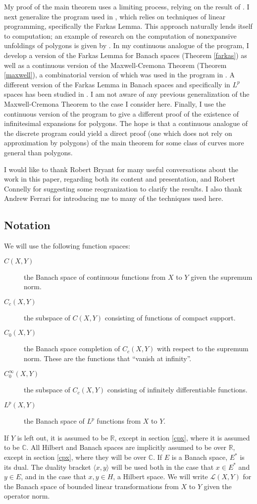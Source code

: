 \documentclass{amsart}
\newcommand{\C}			{\mathbb C}
\newcommand{\R}			{\mathbb R}
\newcommand{\Lin}		{\mathcal L}
\newcommand{\Lp}		{L^p}
\numberwithin{equation}{section}
\begin{document}
My proof of the main theorem uses a limiting process, 
relying on the result of \cite{cdr}.  I next generalize 
the program used in \cite{cdr}, which 
relies on techniques of linear programming, specifically the Farkas 
Lemma.  This approach naturally lends itself to computation; 
an example of research on the computation of nonexpansive unfoldings 
of polygons is given by \cite{energy}.  In my continuous 
analogue of the program, I develop a version of the Farkas 
Lemma for Banach spaces (Theorem \ref{farkas}) as well as a 
continuous version of the Maxwell-Cremona Theorem (Theorem 
\ref{maxwell}), a combinatorial version of which was used in 
the program in \cite{cdr}.  A different version of the Farkas Lemma 
in Banach spaces and specifically in $\Lp$ spaces has been studied 
in \cite{farkas}.  I am not aware of any previous 
generalization of the Maxwell-Cremona Theorem to the 
case I consider here.  Finally, I use the continuous 
version of the program to give a different proof of the existence 
of infinitesimal expansions for polygons.  The hope is that 
a continuous analogue of the discrete program could yield 
a direct proof (one which does not rely on approximation by 
polygons) of the main theorem for some class of curves more 
general than polygons.

I would like to thank Robert Bryant for many useful 
conversations about the work in this paper, regarding both 
its content and presentation, and Robert Connelly for 
suggesting some reogranization to clarify the results.  
I also thank Andrew Ferrari for introducing me to many of 
the techniques used here.

\subsection{Notation}

We will use the following function spaces:
\begin{description}
\item[$C(X,Y)$] the Banach space of continuous functions from 
$X$ to $Y$ given the supremum norm.
\item[$C_c(X,Y)$] the subspace of $C(X,Y)$ consisting of 
functions of compact support.
\item[$C_0(X,Y)$] the Banach space completion of $C_c(X,Y)$ 
with respect to the supremum norm.  These are the functions 
that ``vanish at infinity''.
\item[$C_0^\infty(X,Y)$] the subspace of $C_c(X,Y)$ consisting 
of infinitely differentiable functions.
\item[$\Lp(X,Y)$] the Banach space of $\Lp$ functions from 
$X$ to $Y$.
\end{description}
If $Y$ is left out, it is assumed to be $\R$, except in 
section \ref{cpx}, where it is assumed to be $\C$.  
All Hilbert and Banach spaces are implicitly assumed to 
be over $\R$, except in section \ref{cpx}, where they will 
be over $\C$.  If $E$ is a Banach space, $E^*$ is its dual.  
The duality bracket $\langle x,y\rangle$ will be used both 
in the case that $x\in E^*$ and $y\in E$, and in the case 
that $x,y\in H$, a Hilbert space.  We will write $\Lin(X,Y)$ 
for the Banach space of bounded linear transformations from 
$X$ to $Y$ given the operator norm.
\end{document}
